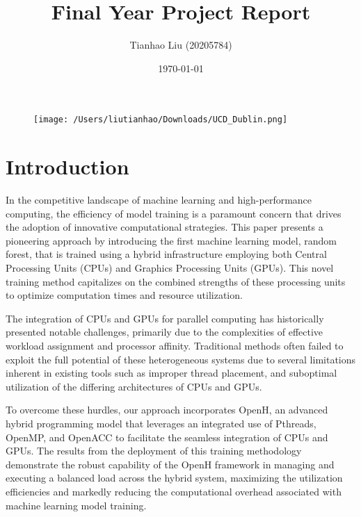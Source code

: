 \documentclass[13pt]{article}
\begin{document}

\title{Final Year Project Report}
\author{Tianhao Liu (20205784)}



\date{\today}
\maketitle

\begin{figure}[ht]
    \centering
    \texttt{[image: /Users/liutianhao/Downloads/UCD\_Dublin.png]}
\end{figure}


\newpage

\tableofcontents

\newpage

\listoffigures

\listoftables

\newpage


\section{Introduction}
In the competitive landscape of machine learning and high-performance computing, the efficiency of model training is a paramount concern that drives the adoption of innovative computational strategies. This paper presents a pioneering approach by introducing the first machine learning model, random forest, that is trained using a hybrid infrastructure employing both Central Processing Units (CPUs) and Graphics Processing Units (GPUs). This novel training method capitalizes on the combined strengths of these processing units to optimize computation times and resource utilization.

The integration of CPUs and GPUs for parallel computing has historically presented notable challenges, primarily due to the complexities of effective workload assignment and processor affinity. Traditional methods often failed to exploit the full potential of these heterogeneous systems due to several limitations inherent in existing tools such as improper thread placement, and suboptimal utilization of the differing architectures of CPUs and GPUs.

To overcome these hurdles, our approach incorporates OpenH, an advanced hybrid programming model that leverages an integrated use of Pthreads, OpenMP, and OpenACC to facilitate the seamless integration of CPUs and GPUs\cite{paper1}. 
The results from the deployment of this training methodology demonstrate the robust capability of the OpenH framework in managing and executing a balanced load across the hybrid system, maximizing the utilization efficiencies and markedly reducing the computational overhead associated with machine learning model training.
\end{document}
